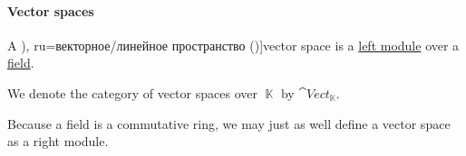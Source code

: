 \paragraph{Vector spaces}

\begin{definition}\label{def:vector_space}
  A \term[ru=линейно пространство (\cite[111]{Обрешков1962ВисшаАлгебра}), ru=векторное/линейное пространство (\cite[def. 1.6.1]{Винберг2014КурсАлгебры})]{vector space} is a \hyperref[def:module]{left module} over a \hyperref[def:field]{field}.

  We denote the category of vector spaces over \( \BbbK \) by \( \cat{Vect}_{\BbbK} \).
\end{definition}
\begin{comments}
  \item Because a field is a commutative ring, we may just as well define a vector space as a right module.
\end{comments}

